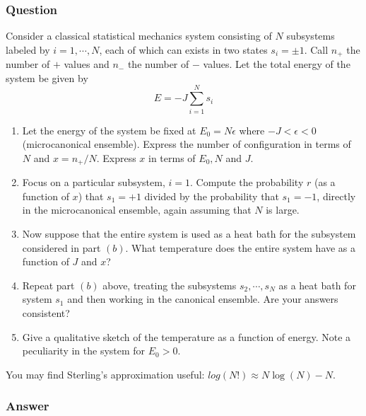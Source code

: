 \subsubsection{Question}
Consider a classical statistical mechanics system consisting of $N$ subsystems labeled by $i=1,\cdots,N$, each of which can exists in two states $s_i=\pm 1$. Call $n_+$ the number of $+$ values and $n_-$ the number of $-$ values. Let the total energy of the system be given by
\begin{equation*}
	E = -J\sum_{i=1}^{N}s_i
\end{equation*}
\begin{enumerate}
	\item Let the energy of the system be fixed at $E_0 = N\epsilon$ where $-J<\epsilon<0$ (microcanonical ensemble). Express the number of configuration in terms of $N$ and $x=n_+/N$. Express $x$ in terms of $E_0, N$ and $J$.
	\item Focus on a particular subsystem, $i=1$. Compute the probability $r$ (as a function of $x$) that $s_1=+1$ divided by the probability that $s_1=-1$, directly in the microcanonical ensemble, again assuming that $N$ is large.
	\item Now suppose that the entire system is used as a heat bath for the subsystem considered in part $(b)$. What temperature does the entire system have as a function of $J$ and $x$?
	\item Repeat part $(b)$ above, treating the subsystems $s_2,\cdots,s_N$ as a heat bath for system $s_1$ and then working in the canonical ensemble. Are your answers consistent?
	\item Give a qualitative sketch of the temperature as a function of energy. Note a peculiarity in the system for $E_0>0$.
\end{enumerate}
You may find Sterling's approximation useful: $log(N!)\approx N\log(N)-N$.


\subsubsection{Answer}
